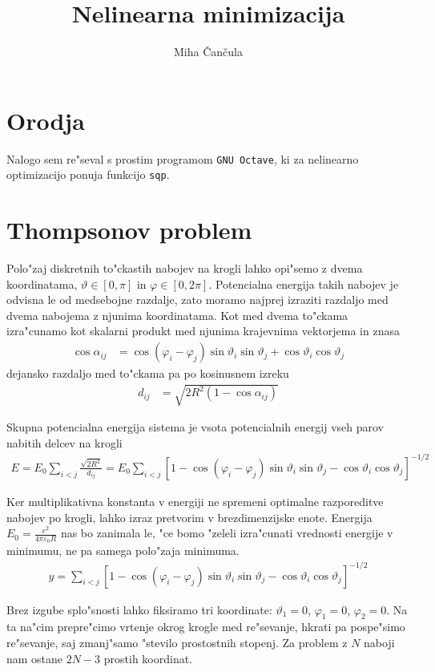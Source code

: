 \documentclass[a4paper,10pt]{article}
\title{Nelinearna minimizacija}
\author{Miha \v Can\v cula}
\renewcommand{\phi}{\varphi}
\renewcommand{\theta}{\vartheta}
\begin{document}
\maketitle

\section{Orodja}
Nalogo sem re"seval s prostim programom \texttt{GNU Octave}, ki za nelinearno optimizacijo ponuja funkcijo \texttt{sqp}. 

\section{Thompsonov problem}
Polo"zaj diskretnih to"ckastih nabojev na krogli lahko opi"semo z dvema koordinatama, $\theta\in[0,\pi]$ in $\phi\in[0,2\pi]$. Potencialna energija takih nabojev je odvisna le od medsebojne razdalje, zato moramo najprej izraziti razdaljo med dvema nabojema z njunima koordinatama. Kot med dvema to"ckama izra"cunamo kot skalarni produkt med njunima krajevnima vektorjema in znasa
\begin{align}
  \cos \alpha_{ij} &= \cos (\phi_i-\phi_j) \sin \theta_i \sin \theta_j + \cos \theta_i \cos\theta_j
\end{align}
dejansko razdaljo med to"ckama pa po kosinusnem izreku
\begin{align}
  d_{ij} &= \sqrt{2R^2(1 - \cos\alpha_{ij})}
\end{align}

Skupna potencialna energija sistema je vsota potencialnih energij vseh parov nabitih delcev na krogli
\begin{align}
  E = E_0 \sum_{i<j} \frac{\sqrt{2R^2}}{d_{ij}} = E_0 \sum_{i<j} \left[ 1 - \cos (\phi_i-\phi_j) \sin \theta_i \sin \theta_j - \cos \theta_i \cos\theta_j \right]^{-1/2} 
\end{align}

Ker multiplikativna konstanta v energiji ne spremeni optimalne razporeditve nabojev po krogli, lahko izraz pretvorim v brezdimenzijske enote. Energija $E_0 = \frac{e^2}{4\pi\varepsilon_0 R}$ nas bo zanimala le, "ce bomo "zeleli izra"cunati vrednosti energije v minimumu, ne pa samega polo"zaja minimuma. 
\begin{align}
  y = \sum_{i<j} \left[ 1 - \cos (\phi_i-\phi_j) \sin \theta_i \sin \theta_j - \cos \theta_i \cos\theta_j\right]^{-1/2} 
\end{align}

Brez izgube splo"snosti lahko fiksiramo tri koordinate: $\theta_1 = 0$, $\phi_1 = 0$, $\phi_2 = 0$. Na ta na"cim prepre"cimo vrtenje okrog krogle med re"sevanje, hkrati pa pospe"simo re"sevanje, saj zmanj"samo "stevilo prostostnih stopenj. Za problem z $N$ naboji nam ostane $2N-3$ prostih koordinat. 
\end{document}
